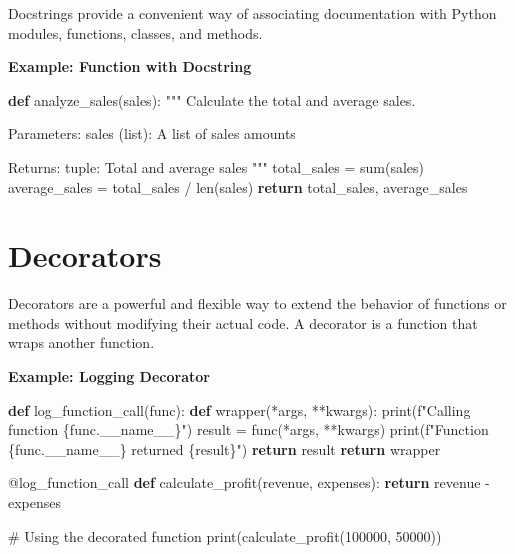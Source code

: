 \documentclass[
  letterpaper,
  DIV=11,
  numbers=noendperiod]{scrreprt}
\newenvironment{Shaded}{\begin{snugshade}}{\end{snugshade}}
\newcommand{\AttributeTok}[1]{\textcolor[rgb]{0.40,0.45,0.13}{#1}}
\newcommand{\BuiltInTok}[1]{\textcolor[rgb]{0.00,0.23,0.31}{#1}}
\newcommand{\CommentTok}[1]{\textcolor[rgb]{0.37,0.37,0.37}{#1}}
\newcommand{\ControlFlowTok}[1]{\textcolor[rgb]{0.00,0.23,0.31}{\textbf{#1}}}
\newcommand{\DecValTok}[1]{\textcolor[rgb]{0.68,0.00,0.00}{#1}}
\newcommand{\KeywordTok}[1]{\textcolor[rgb]{0.00,0.23,0.31}{\textbf{#1}}}
\newcommand{\NormalTok}[1]{\textcolor[rgb]{0.00,0.23,0.31}{#1}}
\newcommand{\OperatorTok}[1]{\textcolor[rgb]{0.37,0.37,0.37}{#1}}
\newcommand{\SpecialCharTok}[1]{\textcolor[rgb]{0.37,0.37,0.37}{#1}}
\newcommand{\SpecialStringTok}[1]{\textcolor[rgb]{0.13,0.47,0.30}{#1}}
\newcommand{\VariableTok}[1]{\textcolor[rgb]{0.07,0.07,0.07}{#1}}
\begin{document}
Docstrings provide a convenient way of associating documentation with
Python modules, functions, classes, and methods.

\textbf{Example: Function with Docstring}

\begin{Shaded}
\begin{Highlighting}[]
\KeywordTok{def}\NormalTok{ analyze\_sales(sales):}
    \CommentTok{"""}
\CommentTok{    Calculate the total and average sales.}

\CommentTok{    Parameters:}
\CommentTok{    sales (list): A list of sales amounts}

\CommentTok{    Returns:}
\CommentTok{    tuple: Total and average sales}
\CommentTok{    """}
\NormalTok{    total\_sales }\OperatorTok{=} \BuiltInTok{sum}\NormalTok{(sales)}
\NormalTok{    average\_sales }\OperatorTok{=}\NormalTok{ total\_sales }\OperatorTok{/} \BuiltInTok{len}\NormalTok{(sales)}
    \ControlFlowTok{return}\NormalTok{ total\_sales, average\_sales}
\end{Highlighting}
\end{Shaded}

\section{Decorators}\label{decorators}

Decorators are a powerful and flexible way to extend the behavior of
functions or methods without modifying their actual code. A decorator is
a function that wraps another function.

\textbf{Example: Logging Decorator}

\begin{Shaded}
\begin{Highlighting}[]
\KeywordTok{def}\NormalTok{ log\_function\_call(func):}
    \KeywordTok{def}\NormalTok{ wrapper(}\OperatorTok{*}\NormalTok{args, }\OperatorTok{**}\NormalTok{kwargs):}
        \BuiltInTok{print}\NormalTok{(}\SpecialStringTok{f"Calling function }\SpecialCharTok{\{}\NormalTok{func}\SpecialCharTok{.}\VariableTok{\_\_name\_\_}\SpecialCharTok{\}}\SpecialStringTok{"}\NormalTok{)}
\NormalTok{        result }\OperatorTok{=}\NormalTok{ func(}\OperatorTok{*}\NormalTok{args, }\OperatorTok{**}\NormalTok{kwargs)}
        \BuiltInTok{print}\NormalTok{(}\SpecialStringTok{f"Function }\SpecialCharTok{\{}\NormalTok{func}\SpecialCharTok{.}\VariableTok{\_\_name\_\_}\SpecialCharTok{\}}\SpecialStringTok{ returned }\SpecialCharTok{\{}\NormalTok{result}\SpecialCharTok{\}}\SpecialStringTok{"}\NormalTok{)}
        \ControlFlowTok{return}\NormalTok{ result}
    \ControlFlowTok{return}\NormalTok{ wrapper}

\AttributeTok{@log\_function\_call}
\KeywordTok{def}\NormalTok{ calculate\_profit(revenue, expenses):}
    \ControlFlowTok{return}\NormalTok{ revenue }\OperatorTok{{-}}\NormalTok{ expenses}

\CommentTok{\# Using the decorated function}
\BuiltInTok{print}\NormalTok{(calculate\_profit(}\DecValTok{100000}\NormalTok{, }\DecValTok{50000}\NormalTok{))}
\end{Highlighting}
\end{Shaded}
\end{document}
